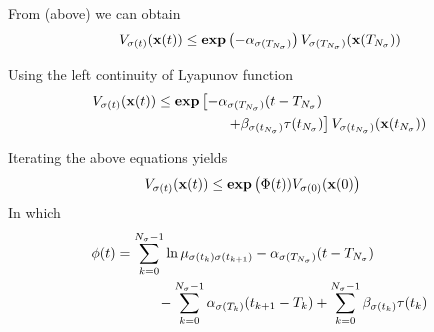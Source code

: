 \documentclass[twocolumn]{autart}    %
\begin{document}
\begin{pf}

    From (above) we can obtain
    \begin{equation}
        \begin{aligned}
            \setlength{\arraycolsep}{0.9pt}
            V_{\sigma(t)}(\bold{x}(t)) &\leq \bold{exp} \left( -\alpha_{\sigma(T_{N_{\sigma}})} \right) V_{\sigma(T_{N_{\sigma}})}(\bold{x}(T_{N_{\sigma}}))\\
        \end{aligned}
    \end{equation}

    Using the left continuity of Lyapunov function 
    \begin{equation}
        \begin{aligned}
            \setlength{\arraycolsep}{0.9pt}
            V_{\sigma(t)}(\bold{x}(t)) &\leq \bold{exp} \left[ -\alpha_{\sigma(T_{N_{\sigma}})}(t-T_{N_{\sigma}})\right.\\
            & \left. \quad \quad \quad \quad \quad+\beta_{\sigma(t_{N_{\sigma}})}\tau(t_{N_{\sigma}})\right]V_{\sigma(t_{N_{\sigma}})}(\bold{x}(t_{N_{\sigma}}))
        \end{aligned}
    \end{equation}


    Iterating the above equations yields 
    \begin{equation}
        \begin{aligned}
            \setlength{\arraycolsep}{0.9pt}
            V_{\sigma(t)}(\bold{x}(t)) &\leq \bold{exp}\left(\Phi(t))V_{\sigma(0)}(\bold{x}(0)\right)
        \end{aligned}
    \end{equation}
    In which
    \begin{equation}
        \begin{aligned}
            \setlength{\arraycolsep}{0.9pt}
            \phi(t) &= \sum_{k=0}^{N_{\sigma}-1}\ln\mu_{\sigma(t_{k})\sigma(t_{k+1})} - \alpha_{\sigma(T_{N_{\sigma}})}(t-T_{N_{\sigma}}) \\
            & \quad \quad \quad - \sum_{k=0}^{N_{\sigma}-1}\alpha_{\sigma(T_{k})}(t_{k+1}-T_{k}) + \sum_{k=0}^{N_{\sigma}-1}\beta_{\sigma(t_{k})}\tau(t_{k})
        \end{aligned}
    \end{equation}
    

\end{pf}
\end{document}
